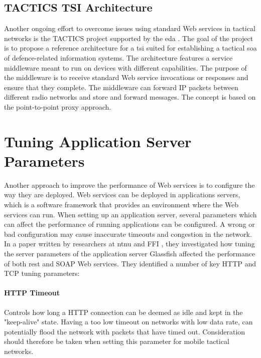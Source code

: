 \subsection{TACTICS TSI Architecture}

Another ongoing effort to overcome issues using standard Web services in
tactical networks is the TACTICS project supported by the \gls{eda}
\cite{tactics-diefenbach}. The goal of the project is to propose a reference
architecture for a \gls{tsi} suited for establishing a tactical \gls{soa} of
defence-related information systems. The architecture features a service
middleware meant to run on devices with different capabilities. The purpose of
the middleware is to receive standard Web service invocations or responses and
ensure that they complete. The middleware can forward IP packets between
different radio networks and store and forward messages. The concept is based on
the point-to-point proxy approach.


\section{Tuning Application Server Parameters}

 Another approach to improve the performance of Web services is to configure
 the way they are deployed. Web services can be deployed in applications
 servers, which is a software framework that provides an environment where the
 Web services can run. When setting up an application server, several parameters
 which can affect the performance of running applications can be
 configured. A wrong or bad configuration may cause inaccurate timeouts and
 congestion in the network. In a paper written by researchers at \gls{ntnu} and
 FFI \cite{johnsen-recommendations}, they
 investigated how tuning the server parameters of the application server
 Glassfish affected the performance of both \gls{rest} and SOAP Web services.
 They identified a number of key HTTP and TCP tuning parameters:

\paragraph{HTTP Timeout} Controls how long a HTTP connection can be deemed as
idle and kept in the "keep-alive" state. Having a too low timeout on networks
with low data rate, can potentially flood the network with packets that have
timed out. Consideration should therefore be taken when setting this
parameter for mobile tactical networks.

